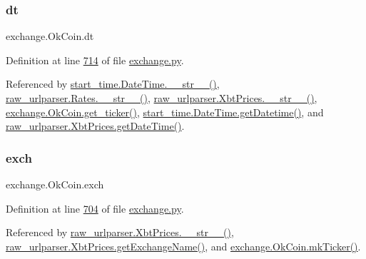 \mbox{\label{classexchange_1_1_ok_coin_ade9d7cddcfa54f2b1ba5452854bfd48b}} 
\subsubsection{\texorpdfstring{dt}{dt}}
{\footnotesize\ttfamily exchange.\+Ok\+Coin.\+dt}



Definition at line \hyperlink{exchange_8py_source_l00714}{714} of file \hyperlink{exchange_8py_source}{exchange.\+py}.



Referenced by \hyperlink{start__time_2____init_____8py_source_l00034}{start\+\_\+time.\+Date\+Time.\+\_\+\+\_\+str\+\_\+\+\_\+()}, \hyperlink{raw__urlparser_8py_source_l00038}{raw\+\_\+urlparser.\+Rates.\+\_\+\+\_\+str\+\_\+\+\_\+()}, \hyperlink{raw__urlparser_8py_source_l00074}{raw\+\_\+urlparser.\+Xbt\+Prices.\+\_\+\+\_\+str\+\_\+\+\_\+()}, \hyperlink{exchange_8py_source_l00716}{exchange.\+Ok\+Coin.\+get\+\_\+ticker()}, \hyperlink{start__time_2____init_____8py_source_l00031}{start\+\_\+time.\+Date\+Time.\+get\+Datetime()}, and \hyperlink{raw__urlparser_8py_source_l00059}{raw\+\_\+urlparser.\+Xbt\+Prices.\+get\+Date\+Time()}.

\mbox{\label{classexchange_1_1_ok_coin_a22678c192b53ddf34e8a636e0cdaf4d4}} 
\subsubsection{\texorpdfstring{exch}{exch}}
{\footnotesize\ttfamily exchange.\+Ok\+Coin.\+exch}



Definition at line \hyperlink{exchange_8py_source_l00704}{704} of file \hyperlink{exchange_8py_source}{exchange.\+py}.



Referenced by \hyperlink{raw__urlparser_8py_source_l00074}{raw\+\_\+urlparser.\+Xbt\+Prices.\+\_\+\+\_\+str\+\_\+\+\_\+()}, \hyperlink{raw__urlparser_8py_source_l00068}{raw\+\_\+urlparser.\+Xbt\+Prices.\+get\+Exchange\+Name()}, and \hyperlink{exchange_8py_source_l00730}{exchange.\+Ok\+Coin.\+mk\+Ticker()}.

